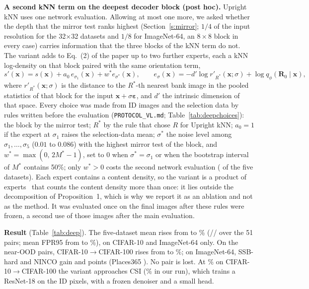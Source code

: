 \documentclass[10pt]{article}
\newcommand{\veps}{\boldsymbol{\varepsilon}}
\newcommand{\Rot}[1]{\mathbf{R}_{#1}}
\begin{document}
\textbf{A second kNN term on the deepest decoder block (post hoc).} Upright kNN uses one network evaluation. Allowing at most one more, we asked whether the depth that the mirror test ranks highest (Section~\ref{s:mirror}; $1/4$ of the input resolution for the 32$\times$32 datasets and $1/8$ for ImageNet-64, an $8\times8$ block in every case) carries information that the three blocks of the kNN term do not. The variant adds to Eq.~(2) of the paper up to two further experts, each a kNN log-density on that block paired with the same orientation term,
\begin{equation}
s'(\mathbf{x})=s(\mathbf{x})+a_0\,e_{\sigma_1}(\mathbf{x})+w^{*}e_{\sigma^{*}}(\mathbf{x}),\qquad e_{\sigma}(\mathbf{x})=-d'\log r'_{R^{*}}(\mathbf{x};\sigma)+\log q_\phi(\Rot{0}\mid\mathbf{x}),
\end{equation}
where $r'_{R^{*}}(\mathbf{x};\sigma)$ is the distance to the $R^{*}$-th nearest bank image in the pooled statistics of that block for the input $\mathbf{x}+\sigma\veps$, and $d'$ the intrinsic dimension of that space. Every choice was made from ID images and the selection data by rules written before the evaluation (\texttt{PROTOCOL\_VL.md}; Table~\ref{tab:deepchoices}): the block by the mirror test; $R^{*}$ by the rule that chose $R$ for Upright kNN; $a_0=1$ if the expert at $\sigma_1$ raises the selection-data mean; $\sigma^{*}$ the noise level among $\sigma_1,\dots,\sigma_5$ ($0.01$ to $0.086$) with the highest mirror test of the block, and $w^{*}=\max(0,\,2M^{*}-1)$, set to 0 when $\sigma^{*}=\sigma_1$ or when the bootstrap interval of $M^{*}$ contains 50\%; only $w^{*}>0$ costs the second network evaluation (\deepTwoPass{} of the five datasets). Each expert contains a content density, so the variant is a product of experts~\cite{hinton2002poe} that counts the content density more than once: it lies outside the decomposition of Proposition~1, which is why we report it as an ablation and not as the method. It was evaluated once on the final images after these rules were frozen, a second use of those images after the main evaluation.

\textbf{Result} (Table~\ref{tab:deep}). The five-dataset mean rises from \oursMean{} to \deepMean\% (\deepWins/\deepTies/\deepLosses{} over the 51 pairs; mean FPR95 from \FPRours{} to \deepFPR\%), on CIFAR-10 and ImageNet-64 only. On the near-OOD pairs, CIFAR-10$\to$CIFAR-100 rises from \pCtenCh{} to \deepNearCten\%; on ImageNet-64, SSB-hard and NINCO gain \deepInSSB{} and \deepInNINCO{} points (Places365 \deepInPlaces). No pair is lost. At \deepNearCten\% on CIFAR-10$\to$CIFAR-100 the variant approaches CSI (\csiCtenCh\% in our run), which trains a ResNet-18 on the ID pixels, with a frozen denoiser and a small head.
\end{document}
